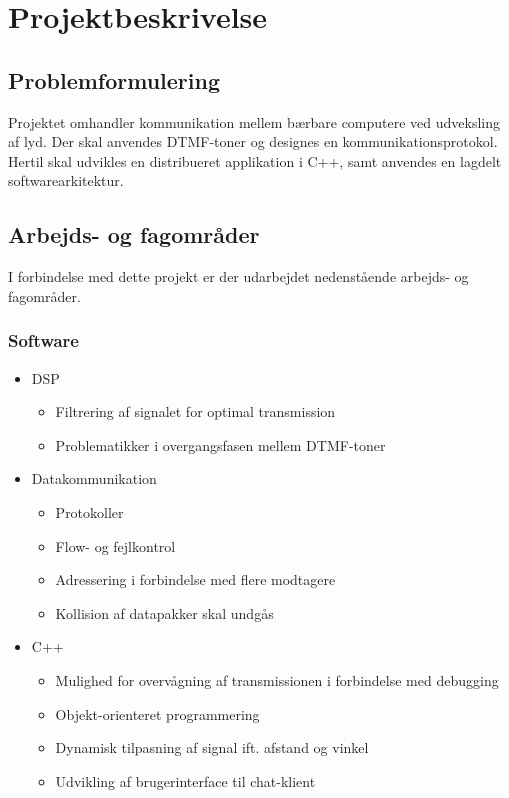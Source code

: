 \section{Projektbeskrivelse}

\subsection{Problemformulering}

Projektet omhandler kommunikation mellem bærbare computere ved udveksling af lyd. Der skal anvendes DTMF-toner og designes en kommunikationsprotokol. Hertil skal udvikles en distribueret applikation i C++, samt anvendes en lagdelt softwarearkitektur.

\subsection{Arbejds- og fagområder}

I forbindelse med dette projekt er der udarbejdet nedenstående arbejds- og fagområder.

\subsubsection{Software}

\begin{itemize}
  \item DSP
  \begin{itemize}
    \item Filtrering af signalet for optimal transmission
    \item Problematikker i overgangsfasen mellem DTMF-toner
  \end{itemize}
  \item Datakommunikation
  \begin{itemize}
    \item Protokoller
    \item Flow- og fejlkontrol
    \item Adressering i forbindelse med flere modtagere
    \item Kollision af datapakker skal undgås
  \end{itemize}
  \item C++
    \begin{itemize}
    \item Mulighed for overvågning af transmissionen i forbindelse med debugging
    \item Objekt-orienteret programmering
    \item Dynamisk tilpasning af signal ift. afstand og vinkel
    \item Udvikling af brugerinterface til chat-klient
  \end{itemize}
\end{itemize}

